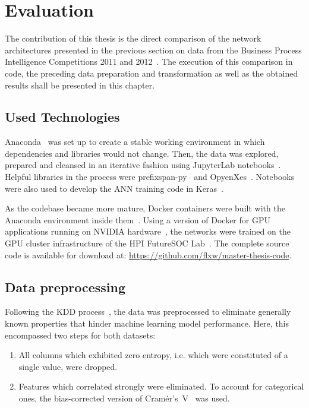 \chapter{Evaluation}\label{chap:evaluation}
The contribution of this thesis is the direct comparison of the network architectures presented in the previous section on data from the Business Process Intelligence Competitions 2011 and 2012~\cite{BPIC2011, BPIC2012}. The execution of this comparison in code, the preceding data preparation and transformation as well as the obtained results shall be presented in this chapter.

\section{Used Technologies}
Anaconda~\cite{web:anaconda} was set up to create a stable working environment in which dependencies and libraries would not change.
Then, the data was explored, prepared and cleansed in an iterative fashion using JupyterLab notebooks~\cite{web:jupyter}. Helpful libraries in the process were prefixspan-py~\cite{web:prefixspan-py} and OpyenXes~\cite{web:opyenxes}. Notebooks were also used to develop the ANN training code in Keras~\cite{web:keras}.

As the codebase became more mature, Docker containers were built with the Anaconda environment inside them~\cite{web:docker}. Using a version of Docker for GPU applications running on NVIDIA hardware~\cite{web:nvidia-docker}, the networks were trained on the GPU cluster infrastructure of the HPI FutureSOC Lab~\cite{web:fsoc}. The complete source code is available for download at: \url{https://github.com/flxw/master-thesis-code}.

\section{Data preprocessing}
Following the KDD process~\cite{fayyad1996data}, the data was preprocessed to eliminate generally known properties that hinder machine learning model performance. Here, this encompassed two steps for both datasets:

\begin{enumerate}
    \item All columns which exhibited zero entropy, i.e. which were constituted of a single value, were dropped.
    \item Features which correlated strongly were eliminated. To account for categorical ones, the bias-corrected version of Cramér's~V~\cite{bergsma2013bias} was used.
\end{enumerate}


